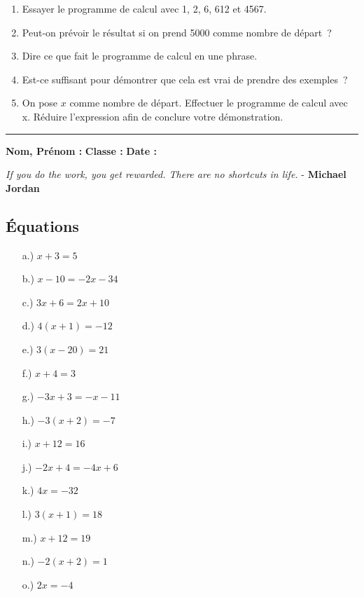 \documentclass[11pt]{article}
\newcommand{\horrule}[1]{\rule{\linewidth}{#1}} %
\begin{document}
\begin{enumerate}
  \item Essayer le programme de calcul avec 1, 2, 6, 612 et 4567.
  \item Peut-on prévoir le résultat si on prend 5000 comme nombre de départ ?
  \item Dire ce que fait le programme de calcul en une phrase.
  \item Est-ce suffisant pour démontrer que cela est vrai de prendre des exemples ?
  \item On pose $x$ comme nombre de départ. Effectuer le programme de calcul avec x. Réduire l’expression afin de conclure votre démonstration.
\end{enumerate}

\vspace{1cm}
\horrule{1px}
\vspace{1cm}

\textbf{Nom, Prénom :} \hspace{8cm} \textbf{Classe :} \hspace{3cm} \textbf{Date :}\\
\vspace{-0.8cm}
\begin{center}
  \textit{If you do the work, you get rewarded. There are no shortcuts in life.}  - \textbf{Michael Jordan}
\end{center}
\vspace{-0.8cm}

\subsection*{Équations}
\begin{multicols}{3}\noindent
  \begin{enumerate}
  \item[a.)] $	x + 3 = 5$
  \item[b.)] $x - 10 = -2x - 34$
  \item[c.)] $	3x + 6 = 2x + 10$
  \item[d.)] $4(x + 1) = -12$
  \item[e.)] $3(x - 20) = 21$
  \item[f.)] $x + 4 = 3$
  \item[g.)] $-3x + 3 = -x - 11$
  \item[h.)] $-3(x + 2) = -7$
  \item[i.)] $x + 12 = 16$
  \item[j.)] $	-2x + 4 = -4x + 6$
  \item[k.)] $4x = -32$
  \item[l.)] $3(x + 1) = 18$
  \item[m.)] $x + 12 = 19$
  \item[n.)] $-2(x + 2) = 1$
  \item[o.)] $2x = -4$
  \end{enumerate}
\end{multicols}
\end{document}
